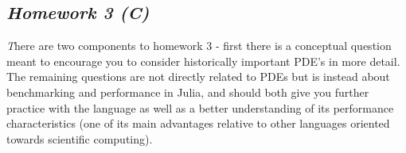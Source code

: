 \documentclass[11pt,a4paper,oneside]{report}
\begin{document}
{\center\color{magenta}
\subsection*{\it\huge Homework 3 (C)}}
{\it\huge T}here are two components to homework 3 - first there is a conceptual question meant to encourage you to consider historically important PDE's in more detail. The remaining questions are not directly related to PDEs but is instead about benchmarking and performance in Julia, and should both give you further practice with the language as well as a better understanding of its performance characteristics (one of its main advantages relative to other languages oriented towards scientific computing).\\
\end{document}
